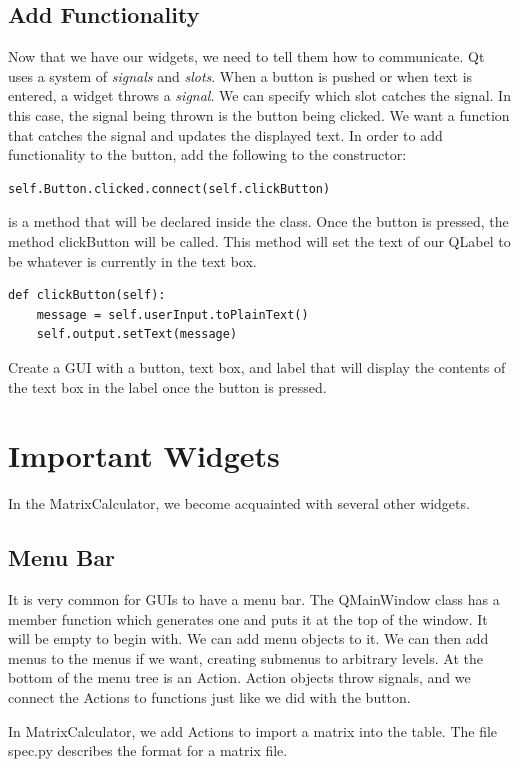 \subsection*{Add Functionality}
Now that we have our widgets, we need to tell them how to communicate.
Qt uses a system of \emph{signals} and \emph{slots}.
When a button is pushed or when text is entered, a widget throws a \emph{signal}.
We can specify which slot catches the signal.
In this case, the signal being thrown is the button being clicked. We want a function that catches the signal and updates the displayed text.  In order to add functionality to the button, add the following to the constructor:
\begin{lstlisting}
self.Button.clicked.connect(self.clickButton)
\end{lstlisting}
 is a method that will be declared inside the  class.  Once the button is pressed, the method clickButton will be called.  This method will set the text of our QLabel to be whatever is currently in the text box.
\begin{lstlisting}
def clickButton(self):
	message = self.userInput.toPlainText()
	self.output.setText(message)
\end{lstlisting}
\begin{problem}
Create a GUI with a button, text box, and label that will display the contents of the text box in the label once the button is pressed.
\label{prob:basicGUI}
\end{problem}

\section*{Important Widgets}
In the MatrixCalculator, we become acquainted with several other widgets.

\subsection*{Menu Bar}
It is very common for GUIs to have a menu bar.  The QMainWindow class has a member function which generates one and puts it at the top of the window.  It will be empty to begin with.  We can add menu objects to it.  We can then add menus to the menus if we want, creating submenus to arbitrary levels.  At the bottom of the menu tree is an Action.  Action objects throw signals, and we connect the Actions to functions just like we did with the button.

In MatrixCalculator, we add Actions to import a matrix into the table.  The file spec.py describes the format for a matrix file.

